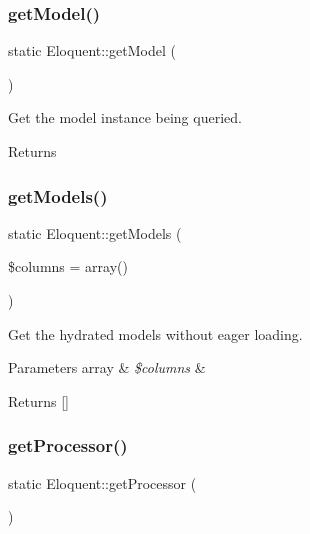 \subsubsection{\texorpdfstring{get\+Model()}{getModel()}}
{\footnotesize\ttfamily static Eloquent\+::get\+Model (\begin{DoxyParamCaption}{ }\end{DoxyParamCaption})\hspace{0.3cm}{\ttfamily [static]}}

Get the model instance being queried.

\begin{DoxyReturn}{Returns}

\end{DoxyReturn}
\mbox{\label{class_eloquent_a20abe0ed9fc973599d443fb3a9302394}} 
\subsubsection{\texorpdfstring{get\+Models()}{getModels()}}
{\footnotesize\ttfamily static Eloquent\+::get\+Models (\begin{DoxyParamCaption}\item[{}]{\$columns = {\ttfamily array()} }\end{DoxyParamCaption})\hspace{0.3cm}{\ttfamily [static]}}

Get the hydrated models without eager loading.


\begin{DoxyParams}[1]{Parameters}
array & {\em \$columns} & \\
\hline
\end{DoxyParams}
\begin{DoxyReturn}{Returns}
\mbox{[}\mbox{]} 
\end{DoxyReturn}
\mbox{\label{class_eloquent_af06482fd0045347d96e02da15e1bcd2c}} 
\subsubsection{\texorpdfstring{get\+Processor()}{getProcessor()}}
{\footnotesize\ttfamily static Eloquent\+::get\+Processor (\begin{DoxyParamCaption}{ }\end{DoxyParamCaption})\hspace{0.3cm}{\ttfamily [static]}}

